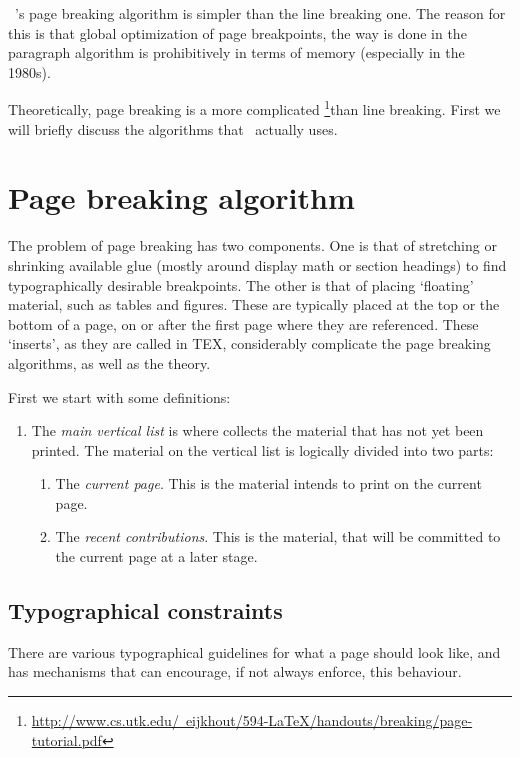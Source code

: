 \tex\ 's page breaking algorithm is simpler than the line breaking one. The reason for this is that global optimization
of page breakpoints, the way is done in the paragraph algorithm is prohibitively in terms of memory (especially in the 1980s).

Theoretically, page breaking is a more complicated \footnote{\href{test}{http://www.cs.utk.edu/~eijkhout/594-LaTeX/handouts/breaking/page-tutorial.pdf}}than line breaking. First we will briefly discuss the algorithms that \tex\ actually
uses.


\section{Page breaking algorithm}

The problem of page breaking has two components. One is that of stretching or shrinking
available glue (mostly around display math or section headings) to find typographically
desirable breakpoints. The other is that of placing ‘floating’ material, such as tables and
figures. These are typically placed at the top or the bottom of a page, on or after the first
page where they are referenced. These ‘inserts’, as they are called in TEX, considerably
complicate the page breaking algorithms, as well as the theory.

First we start with some definitions:

\begin{enumerate}
\item The \emph{main vertical list} is where \tex collects the material that has not yet been printed.
The material on the vertical list is logically divided into two parts:
  \begin{enumerate}
     \item The \emph{current page}. This is the material \tex intends to print on the current page.
     \item The \emph{recent contributions}. This is the material, that will be committed to the 
           current page at a later stage.
  \end{enumerate}
\end{enumerate}

\subsection{Typographical constraints}

There are various typographical guidelines for what a page should look like, and \tex has
mechanisms that can encourage, if not always enforce, this behaviour.

